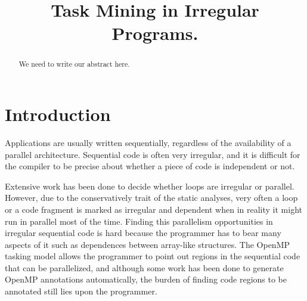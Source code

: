 \documentclass[pageno]{jpaper}
\begin{document}
\title{Task Mining in Irregular Programs.}

\date{}
\maketitle

\thispagestyle{empty}

\begin{abstract}
We need to write our abstract here.
\end{abstract}

\section{Introduction}
\label{sec:intro}


Applications are usually written sequentially, regardless of the availability of a parallel architecture. Sequential code is often very irregular, and it is difficult for the compiler to be precise about whether a piece of code is independent or not. 


Extensive work has been done to decide whether loops are irregular or parallel. However, due to the conservatively trait of the static analyses, very often a
loop or a code fragment is marked as irregular and dependent when in reality it might run in parallel most of the time. Finding this parallelism opportunities in irregular sequential code is hard because the programmer has to bear many aspects of it such as dependences between array-like structures.
The OpenMP tasking model allows the programmer to point out regions in the sequential code that can be parallelized, and although some work has been done to generate OpenMP annotations automatically, the burden of finding code regions to be annotated still lies upon the programmer.
\end{document}
